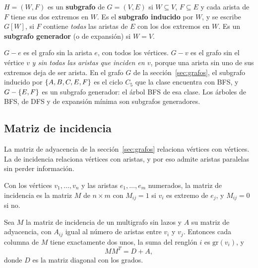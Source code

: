 \documentclass[11pt,letterpaper]{article}
\begin{document}
\begin{definicion}[Subgrafo]
  \label{def:subgrafo}
  $H = (W, F)$ es un \textbf{subgrafo} de $G = (V, E)$ si
  $W \subseteq V$, $F \subseteq E$ y cada arista de $F$ tiene sus dos
  extremos en $W$. Es el \textbf{subgrafo inducido} por $W$, y se
  escribe $G[W]$, si $F$ contiene \emph{todas} las aristas de $E$ con
  los dos extremos en $W$. Es un \textbf{subgrafo generador} (o de
  expansión) si $W = V$.
\end{definicion}

$G - e$ es el grafo sin la arista $e$, con todos los vértices. $G - v$
es el grafo sin el vértice $v$ \emph{y sin todas las aristas que
inciden en $v$}, porque una arista sin uno de sus extremos deja de ser
arista. En el grafo $G$ de la sección~\ref{sec:grafos}, el subgrafo
inducido por $\left\{ A, B, C, E, F \right\}$ es el ciclo $C_5$ que la clase
encuentra con BFS, y $G - \left\{ E, F \right\}$ es un subgrafo generador: el
árbol BFS de esa clase. Los árboles de BFS, de DFS y de expansión
mínima son subgrafos generadores.


\subsection*{Matriz de incidencia}

La matriz de adyacencia de la sección~\ref{sec:grafos} relaciona
vértices con vértices. La de incidencia relaciona vértices con
aristas, y por eso admite aristas paralelas sin perder información.

\begin{definicion}
  \label{def:matriz-incidencia}
  Con los vértices $v_1, \dots, v_n$ y las aristas $e_1, \dots, e_m$
  numerados, la matriz de incidencia es la matriz $M$ de $n \times m$
  con $M_{ij} = 1$ si $v_i$ es extremo de $e_j$, y $M_{ij} = 0$ si no.
\end{definicion}

\begin{proposicion}
  \label{prop:incidencia}
  Sea $M$ la matriz de incidencia de un multigrafo sin lazos y $A$ su
  matriz de adyacencia, con $A_{ij}$ igual al número de aristas entre
  $v_i$ y $v_j$. Entonces cada columna de $M$ tiene exactamente dos
  unos, la suma del renglón $i$ es $\text{gr}(v_i)$, y
  \[
    M M^{T} = D + A ,
  \]
  donde $D$ es la matriz diagonal con los grados.
\end{proposicion}
\end{document}
